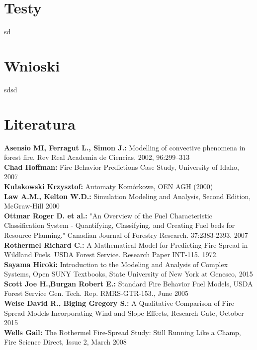 \documentclass[a4paper, 11pt]{article}
\begin{document}
	\begin{figure}[bt]
	\end{figure}
	\section{Testy}
	\indent
	sd
	\section{Wnioski}
	\indent
	
	sdsd
	\section{Literatura}
	
\textbf{Asensio MI, Ferragut L., Simon J.:} Modelling of convective phenomena in forest fire. Rev Real Academia de Ciencias, 2002, 96:299–313\\
\textbf{Chad Hoffman:} Fire Behavior Predictions Case Study, University of Idaho, 2007\\
\textbf{Kułakowski Krzysztof:} Automaty Komórkowe, OEN AGH (2000) \\
\textbf{Law A.M., Kelton W.D.:} Simulation Modeling and Analysis, Second Edition, McGraw-Hill 2000\\
\textbf{Ottmar Roger D. et al.:} "An Overview of the Fuel Characteristic Classification System - Quantifying, Classifying, and Creating Fuel beds for Resource Planning." Canadian Journal of Forestry Research. 37:2383-2393. 2007\\
\textbf{Rothermel Richard C.:} A Mathematical Model for Predicting Fire Spread in Wildland Fuels. USDA Forest Service. Research Paper INT-115. 1972.\\
\textbf{Sayama Hiroki:} Introduction to the Modeling and Analysis of Complex Systems, Open SUNY Textbooks, State University of New York at Geneseo, 2015\\	
\textbf{Scott Joe H.,Burgan Robert E.:} Standard Fire Behavior Fuel Models, USDA Forest Service Gen. Tech. Rep. RMRS-GTR-153., June 2005\\	
\textbf{Weise David R., Biging Gregory S.:} A Qualitative Comparison of Fire Spread Models Incorporating Wind and Slope Effects, Research Gate, October 2015\\
\textbf{Wells Gail:} The Rothermel Fire-Spread Study: Still Running Like a Champ, Fire Science Direct, Issue 2, March 2008\\




\end{document}
